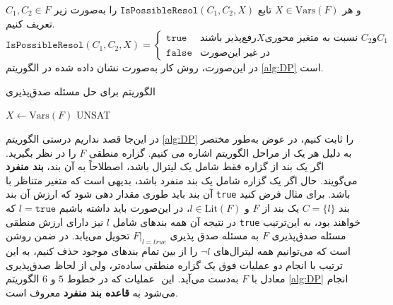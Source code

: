 $C_{1}, C_{2}\in F$
و  هر 
$X\in \mathrm{Vars}(F)$
تابع 
$\texttt{IsPossibleResol}(C_{1}, C_{2},X)$
را به‌صورت زیر تعریف کنیم. 
$$\texttt{IsPossibleResol}(C_{1}, C_{2},X) = \left\{
\begin{array}{lr}
\texttt{true}& 
\text{رفع‌پذیر باشند}
X
\text{نسبت به متغیر محوری }
C_{2}
\text{و}
C_{1}
\\
\texttt{false}& 
\text{در غیر این‌صورت}
\end{array}
\right.
$$
  در این‌صورت، روش کار 
به‌صورت نشان داده شده در الگوریتم 
\ref{alg:DP}
است.
\begin{algorithm}
\renewcommand{\algorithmicrequire}{\textbf{Input:}}
\renewcommand{\algorithmicensure}{\textbf{Output:}}
\caption{الگوریتم  
برای حل مسئله صدق‌پذیری}
\label{alg:DP}
\begin{latin}
	\begin{algorithmic}[1]
  \ENDIF
		\ENDIF
		\ENDIF
		\STATE $X\gets \mathrm{Vars}(F)$
  \RETURN UNSAT			   			
	 \ENDIF
  \ENDWHILE
  \ENDWHILE
  \EndFunction
	\end{algorithmic}
	\end{latin}
\end{algorithm}
در این‌جا قصد نداریم درستی الگوریتم 
\ref{alg:DP}
را ثابت کنیم، در عوض به‌طور مختصر به دلیل هر یک از مراحل الگوریتم اشاره می کنیم. گزاره منطقی 
$F$
را در نظر بگیرید. اگر یک بند از گزاره فقط شامل یک لیترال باشد، اصطلاحاً به آن بند،  
\textbf{بند منفرد}
می‌گویند. حال اگر یک گزاره شامل یک بند منفرد باشد، بدیهی است که متغیر متناظر با آن بند باید طوری مقدار دهی شود که ارزش آن بند 
\texttt{true}
باشد. برای مثال فرض کنید بند 
$C = \{l\}$
یک بند از 
$F$
و 
$l\in \mathrm{Lit}(F)$، 
در این‌صورت باید داشته باشیم 
$l = \texttt{true}$
که در نتیجه آن همه بندهای شامل 
$l$
نیز دارای ارزش منطقی 
\texttt{true}
خواهند بود، به این‌ترتیب  مسئله صدق‌پذیری 
$F$
به مسئله صدق پذیری 
$F|_{l = true}$
تحویل می‌یابد. در ضمن روشن است که می‌توانیم همه لیترال‌های 
$\neg l$
را از بین تمام بندهای موجود حذف کنیم، به این ترتیب با انجام دو عملیات فوق یک گزاره منطقی ساده‌تر، ولی از لحاظ صدق‌پذیری  معادل با 
$F$
به‌دست می‌آید.  این ‌ عملیات  که در خطوط 
$5$
و 
$6$
الگوریتم 
\ref{alg:DP}
انجام می‌شود  به 
\textbf{قاعده بند منفرد}
معروف است. 

